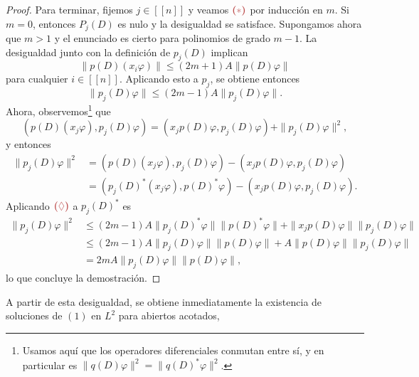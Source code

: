 \documentclass[11pt]{article}
\theoremstyle{colored}
\newcommand{\nat}[1]{[\![#1]\!]}
\newcommand{\ip}[1]{( #1 )}
\newcommand{\paint}[1]{\color{color}{#1}}
\newcommand{\tpaint}[1]{\paint{\textbf{#1}}}
\begin{document}
\begin{proof}
Para terminar, fijemos $j \in \nat{n}$ y veamos $\tpaint{($\ast$)}$ por inducción en $m$. Si $m = 0$, entonces $P_j(D)$ es nulo y la desigualdad se satisface. Supongamos ahora que $m > 1$ y el enunciado es cierto para polinomios de grado $m-1$. La desigualdad junto con la definición de $p_j(D)$ implican
\[
\|p(D)(x_i\varphi)\| \leq (2m+1)A\|p(D)\varphi\| \tag{$\lozenge$}
\]
para cualquier $i \in \nat{n}$. Aplicando esto a $p_j$, se obtiene entonces 
\[
\|p_j(D)\varphi\| \leq (2m-1)A\|p_j(D)\varphi\|.
\]
Ahora, observemos\footnote{Usamos aquí que los operadores diferenciales conmutan entre sí, y en particular es $\|q(D)\varphi\|^2 = \|q(D)^\ast \varphi\|^2$.} que
\[
\ip{p(D)(x_j\varphi),p_j(D)\varphi} = \ip{x_jp(D)\varphi,p_j(D)\varphi} + \|p_j(D)\varphi\|^2,
\]
y entonces
\begin{align*}
\|p_j(D)\varphi\|^2 &= \ip{p(D)(x_j\varphi),p_j(D)\varphi} - \ip{x_jp(D)\varphi,p_j(D)\varphi}\\
&= \ip{p_j(D)^\ast(x_j\varphi),p(D)^\ast\varphi} - \ip{x_jp(D)\varphi,p_j(D)\varphi}.
\end{align*}
Aplicando $\tpaint{($\lozenge$)}$ a $p_j(D)^\ast$ es
\begin{align*}
\|p_j(D)\varphi\|^2&\leq (2m-1)A\|p_j(D)^\ast\varphi\|\|p(D)^\ast\varphi\| + \|x_jp(D)\varphi\|\|p_j(D)\varphi\|\\
& \leq (2m-1)A\|p_j(D)\varphi\|\|p(D)\varphi\| + A\|p(D)\varphi\|\|p_j(D)\varphi\|\\
& = 2mA\|p_j(D)\varphi\|\|p(D)\varphi\|,
\end{align*}
lo que concluye la demostración.
\end{proof}

A partir de esta desigualdad, se obtiene inmediatamente la existencia de soluciones de $(1)$ en $L^2$ para abiertos acotados, 
\end{document}
